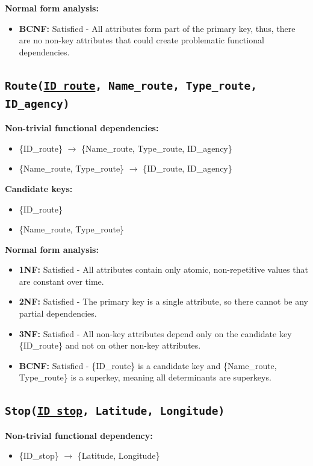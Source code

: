 \documentclass[a4paper, 12pt]{article}
\begin{document}
\textbf{Normal form analysis:}
\begin{itemize}
    \item \textbf{BCNF:} Satisfied -  All attributes form part of the primary key, thus, there are no non-key attributes that could create problematic functional dependencies.
\end{itemize}

\subsection{\texttt{{Route}(\underline{ID\_route}, Name\_route, Type\_route, ID\_agency)}}
\textbf{Non-trivial functional dependencies:}
\begin{itemize}
    \item \{ID\_route\} $\rightarrow$ \{Name\_route, Type\_route, ID\_agency\}
    \item \{Name\_route, Type\_route\} $\rightarrow$ \{ID\_route, ID\_agency\}
\end{itemize}

\textbf{Candidate keys:}
\begin{itemize}
    \item \{ID\_route\}
    \item \{Name\_route, Type\_route\}
\end{itemize}

\textbf{Normal form analysis:}
\begin{itemize}
    \item \textbf{1NF:} Satisfied - All attributes contain only atomic, non-repetitive values that are constant over time.
    
    \item \textbf{2NF:} Satisfied - The primary key is a single attribute, so there cannot be any partial dependencies.
    
    \item \textbf{3NF:} Satisfied - All non-key attributes depend only on the candidate key \{ID\_route\} and not on other non-key attributes.
    
    \item \textbf{BCNF:} Satisfied - \{ID\_route\} is a candidate key and \{Name\_route, Type\_route\} is a superkey, meaning all determinants are superkeys.
\end{itemize}

\subsection{\texttt{{Stop}(\underline{ID\_stop}, Latitude, Longitude)}}
\textbf{Non-trivial functional dependency:}
\begin{itemize}
    \item \{ID\_stop\} $\rightarrow$ \{Latitude, Longitude\}
\end{itemize}
\end{document}
